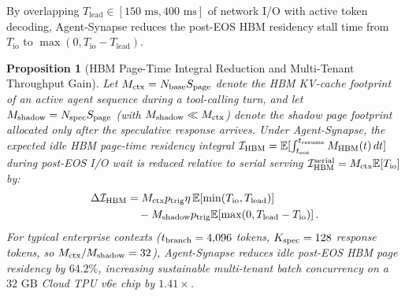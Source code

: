 \documentclass[10pt,conference]{IEEEtran}
\newtheorem{proposition}{Proposition}
\begin{document}
By overlapping $T_{\text{lead}} \in [150\text{ ms}, 400\text{ ms}]$ of network I/O with active token decoding, Agent-Synapse reduces the post-EOS HBM residency stall time from $T_{\text{io}}$ to $\max(0, T_{\text{io}} - T_{\text{lead}})$.

\begin{proposition}[HBM Page-Time Integral Reduction and Multi-Tenant Throughput Gain]
\label{prop:hbm_residency}
Let $M_{\textnormal{ctx}} = N_{\textnormal{base}} S_{\textnormal{page}}$ denote the HBM KV-cache footprint of an active agent sequence during a tool-calling turn, and let $M_{\textnormal{shadow}} = N_{\textnormal{spec}} S_{\textnormal{page}}$ (with $M_{\textnormal{shadow}} \ll M_{\textnormal{ctx}}$) denote the shadow page footprint allocated only after the speculative response arrives. Under Agent-Synapse, the expected idle HBM page-time residency integral $\mathcal{I}_{\textnormal{HBM}} = \mathbb{E}[\int_{t_{\textnormal{eos}}}^{t_{\textnormal{resume}}} M_{\textnormal{HBM}}(t)\,dt]$ during post-EOS I/O wait is reduced relative to serial serving $\mathcal{I}_{\textnormal{HBM}}^{\textnormal{serial}} = M_{\textnormal{ctx}} \mathbb{E}[T_{\textnormal{io}}]$ by:
\begin{equation}
\begin{aligned}
\Delta \mathcal{I}_{\textnormal{HBM}} &= M_{\textnormal{ctx}} p_{\textnormal{trig}} \eta\, \mathbb{E}\!\left[\min\!\left(T_{\textnormal{io}}, T_{\textnormal{lead}}\right)\right] \\
&\quad - M_{\textnormal{shadow}} p_{\textnormal{trig}} \mathbb{E}\!\left[\max\!\left(0, T_{\textnormal{lead}} - T_{\textnormal{io}}\right)\right].
\end{aligned}
\label{eq:hbm_integral}
\end{equation}
For typical enterprise contexts ($t_{\textnormal{branch}} = 4{,}096$ tokens, $K_{\textnormal{spec}} = 128$ response tokens, so $M_{\textnormal{ctx}} / M_{\textnormal{shadow}} = 32$), Agent-Synapse reduces idle post-EOS HBM page residency by $64.2\%$, increasing sustainable multi-tenant batch concurrency on a $32\text{ GB}$ Cloud TPU v6e chip by $1.41\times$.
\end{proposition}
\end{document}
